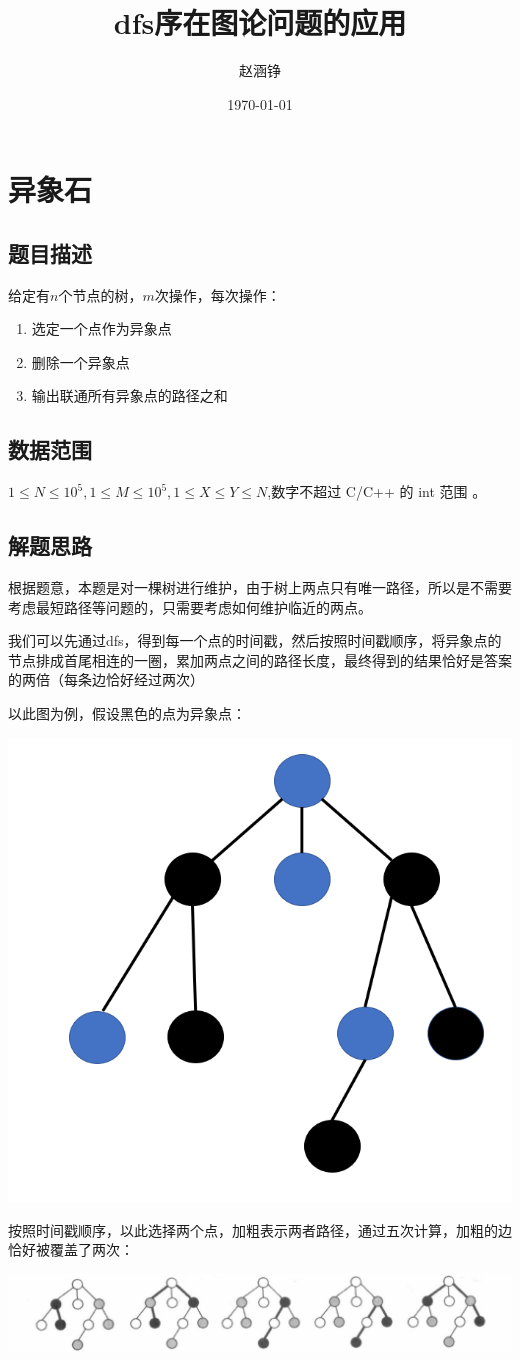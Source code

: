 \documentclass[UTF8]{ctexart}
\title{dfs序在图论问题的应用}
\author{赵涵铮}
\date{\today}
\begin{document}
	\maketitle
	
	\section{异象石}
	\subsection{题目描述}
	给定有$n$个节点的树，$m$次操作，每次操作：
	\begin{enumerate}
		\item 选定一个点作为异象点
		\item 删除一个异象点
		\item 输出联通所有异象点的路径之和
	\end{enumerate}
	\subsection{数据范围}
	$1\leq N\leq 10^5,1\leq M\leq 10^5,1\leq X \leq Y\leq N$,数字不超过 C/C++ 的 int 范围	。
	\subsection{解题思路}
	根据题意，本题是对一棵树进行维护，由于树上两点只有唯一路径，所以是不需要考虑最短路径等问题的，只需要考虑如何维护临近的两点。
	
	我们可以先通过dfs，得到每一个点的时间戳，然后按照时间戳顺序，将异象点的节点排成首尾相连的一圈，累加两点之间的路径长度，最终得到的结果恰好是答案的两倍（每条边恰好经过两次）
	
	以此图为例，假设黑色的点为异象点：
	
	
		\includegraphics[width =0.3\linewidth]{./figure/simple}
	
	
	按照时间戳顺序，以此选择两个点，加粗表示两者路径，通过五次计算，加粗的边恰好被覆盖了两次：
	
		\includegraphics[width = \linewidth]{./figure/sum}
	
\end{document}
